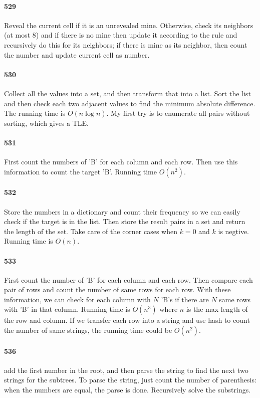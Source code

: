 \documentclass[11pt]{article}
\begin{document}
\paragraph{529}
Reveal the current cell if it is an unrevealed mine.
Otherwise, check its neighbors (at most 8) and if there is no mine then update it according to the rule and recursively do this for its neighbors; if there is mine as its neighbor, then count the number and update current cell as number.

\paragraph{530}
Collect all the values into a set, and then transform that into a list.
Sort the list and then check each two adjacent values to find the minimum absolute difference. 
The running time is $O(n \log n)$.
My first try is to enumerate all pairs without sorting, which gives a TLE.

\paragraph{531}
First count the numbers of 'B' for each column and each row. Then use this information to count the target 'B'.
Running time $O(n^2)$.


\paragraph{532}
Store the numbers in a dictionary and count their frequency so we can easily check if the target is in the list. 
Then store the result pairs in a set and return the length of the set. Take care of the corner cases when $k = 0$ 
and $k$ is negtive.
Running time is $O(n)$.


\paragraph{533}
First count the number of 'B' for each column and each row. Then compare each pair of rows and count the number of same rows
for each row. With these information, we can check for each column with $N$ 'B's if there are $N$ same rows with 'B' in that 
column. 
Running time is $O(n^3)$ where $n$ is the max length of the row and column. If we transfer each row into a string and use hash to count the number of same strings, the running time could be $O(n^2)$.

\paragraph{536}
add the first number in the root, and then parse the string to find the next two strings for the subtrees. To parse the 
string, just count the number of parenthesis: when the numbers are equal, the parse is done. Recursively solve the substrings.
\end{document}
